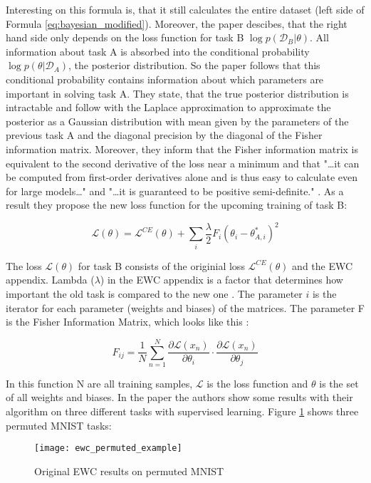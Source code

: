 Interesting on this formula is, that it still calculates the entire dataset (left side of Formula \eqref{eq:bayesian_modified}). Moreover, the paper descibes, that the right hand side only depends on the loss function for task B $\log p(\mathcal{D}_B | \theta)$. All information about task A is absorbed into the conditional probability $\log p(\theta | \mathcal{D}_A)$, the posterior distribution.
So the paper follows that this conditional probability contains information about which parameters are important in solving task A.
\cite{elastic-weight-consolidation, schaeffer_ewc}
\newline
They state, that the true posterior distribution is intractable and follow with the Laplace approximation to approximate the posterior as a Gaussian distribution with mean given by the parameters of the previous task A and the diagonal precision by the diagonal of the Fisher information matrix.
\cite{elastic-weight-consolidation}
\newline
Moreover, they inform that the Fisher information matrix is equivalent to the second derivative of the loss near a minimum and that "…it can be computed from first-order derivatives alone and is thus easy to calculate even for large models…" \cite{elastic-weight-consolidation} and "…it is guaranteed to be positive semi-definite."
\cite{elastic-weight-consolidation}.
\cite{elastic-weight-consolidation, schaeffer_ewc}
\newline
As a result they propose the new loss function for the upcoming training of task B:

\begin{equation}
    \mathcal{L}(\theta) = \mathcal{L}^{CE}(\theta) + \sum_{i} \frac{\lambda}{2} F_{i} (\theta_{i} - \theta_{A,i}^{*})^2
\end{equation}

The loss $\mathcal{L}(\theta)$ for task B consists of the originial loss $\mathcal{L}^{CE}(\theta)$ and the EWC appendix.
Lambda ($\lambda$) in the EWC appendix is a factor that determines how important the old task is compared to the new one \cite{elastic-weight-consolidation}.
The parameter $i$ is the iterator for each parameter (weights and biases) of the matrices.
The parameter F is the Fisher Information Matrix, which looks like this \cite{incremental-moment-matching}:

\begin{equation}
    F_{ij} = \frac{1}{N} \sum_{n=1}^{N} \frac{\partial \mathcal{L} \left( x_n \right) }{\partial \theta_{i}} \cdot \frac{\partial \mathcal{L} \left( x_n \right) }{\partial \theta_{j}}
\end{equation}

In this function N are all training samples, $\mathcal{L}$ is the loss function and $\theta$ is the set of all weights and biases.
In the paper the authors show some results with their algorithm on three different tasks with supervised learning. Figure \ref{fig:ewc_permuted_example} shows three permuted MNIST tasks:
\begin{figure}[H]
    \centering
    \texttt{[image: ewc\_permuted\_example]}
    \caption{\cite{elastic-weight-consolidation} Original EWC results on permuted MNIST}
    \label{fig:ewc_permuted_example}
\end{figure}